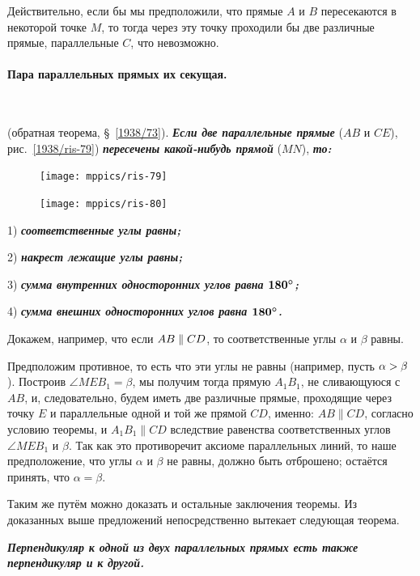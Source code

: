 \documentclass[oneside]{book}
\begin{document}
Действительно, если бы мы предположили, что прямые $A$ и $B$ пересекаются в некоторой точке $M$, то тогда через эту точку проходили бы две различные прямые, параллельные $C$, что невозможно.

\paragraph{Пара параллельных прямых их секущая.}\label{1938/77}\ 

\smallskip
{} (обратная теорема, §~\ref{1938/73}).
\textbf{\emph{Если две параллельные прямые}} ($AB$ и $CE$), рис.~\ref{1938/ris-79}) \textbf{\emph{пересечены какой-нибудь прямой}} ($MN$), \textbf{\emph{то:}}

\begin{figure}
\centering
\texttt{[image: mppics/ris-79]}
\caption{}\label{1938/ris-79}
\bigskip
\texttt{[image: mppics/ris-80]}
\caption{}\label{1938/ris-80}
\end{figure}

1) \textbf{\emph{соответственные углы равны;}}

2) \textbf{\emph{накрест лежащие углы равны;}}

3) \textbf{\emph{сумма внутренних односторонних углов равна $\bm{180\degree}$;}}

4) \textbf{\emph{сумма внешних односторонних углов равна $\bm{180\degree}$.}}

Докажем, например, что если $AB\z\parallel CD$, то соответственные углы $\alpha$ и $\beta$ равны.

Предположим противное, то есть что эти углы не равны (например, пусть $\alpha \z> \beta$).
Построив $\angle MEB_1 = \beta$, мы получим тогда прямую $A_1B_1$, не сливающуюся с $AB$, и, следовательно, будем иметь две различные прямые, проходящие через точку $E$ и параллельные одной и той же прямой $CD$, именно:
$AB\parallel CD$, согласно условию теоремы, и $A_1B_1\parallel CD$ вследствие равенства соответственных углов $\angle MEB_1$ и $ \beta$.
Так как это противоречит аксиоме параллельных линий, то наше предположение, что углы $\alpha$ и $\beta$ не равны, должно быть отброшено;
остаётся принять, что $ \alpha =  \beta$.

Таким же путём можно доказать и остальные заключения теоремы.
Из доказанных выше предложений непосредственно вытекает следующая теорема.

\textbf{\emph{Перпендикуляр к одной из двух параллельных прямых есть также перпендикуляр и к другой.}}
\end{document}
